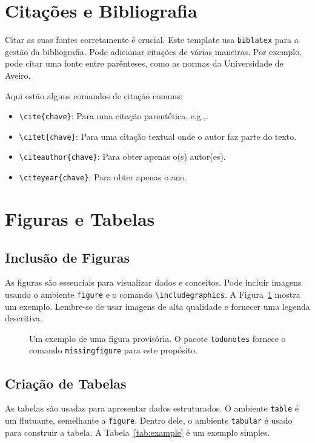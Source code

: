 \section{Citações e Bibliografia}
Citar as suas fontes corretamente é crucial. Este template usa \texttt{biblatex} para a gestão da bibliografia. Pode adicionar citações de várias maneiras. Por exemplo, pode citar uma fonte entre parênteses, como as normas da Universidade de Aveiro.

Aqui estão alguns comandos de citação comuns:
\begin{itemize}
    \item \verb|\cite{chave}|: Para uma citação parentética, e.g.,.
    \item \verb|\citet{chave}|: Para uma citação textual onde o autor faz parte do texto.
    \item \verb|\citeauthor{chave}|: Para obter apenas o(s) autor(es).
    \item \verb|\citeyear{chave}|: Para obter apenas o ano.
\end{itemize}

\section{Figuras e Tabelas}

\subsection{Inclusão de Figuras}
As figuras são essenciais para visualizar dados e conceitos. Pode incluir imagens usando o ambiente \texttt{figure} e o comando \verb|\includegraphics|. A Figura~\ref{fig:placeholder} mostra um exemplo. Lembre-se de usar imagens de alta qualidade e fornecer uma legenda descritiva.

\begin{figure}[H]
    \centering
    \caption{Um exemplo de uma figura provisória. O pacote \texttt{todonotes} fornece o comando \texttt{missingfigure} para este propósito.}
    \label{fig:placeholder}
\end{figure}

\subsection{Criação de Tabelas}
As tabelas são usadas para apresentar dados estruturados. O ambiente \texttt{table} é um flutuante, semelhante a \texttt{figure}. Dentro dele, o ambiente \texttt{tabular} é usado para construir a tabela. A Tabela~\ref{tab:example} é um exemplo simples.

